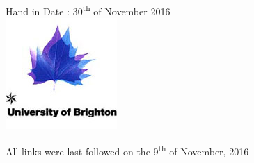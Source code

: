 \begin{titlepage}

{\large Hand in Date : 30\textsuperscript{th} of November 2016}\\[2cm] %


\includegraphics[scale=0.60]{Images/BrightonLogo.jpg}\\[1cm] %




\vfill %

\end{titlepage}
\tableofcontents
\pagebreak






\pagebreak
\printbibliography

All links were last followed on the 9\textsuperscript{th} of November, 2016


